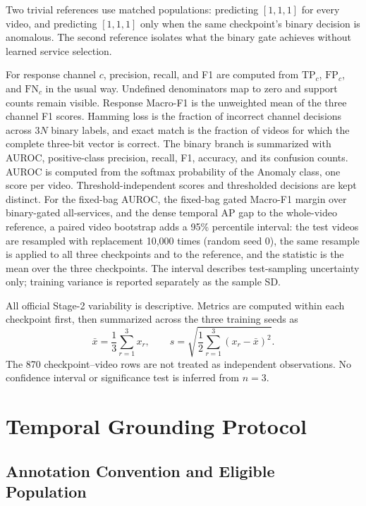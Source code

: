 Two trivial references use matched populations: predicting $[1,1,1]$ for every video, and predicting $[1,1,1]$ only when the same checkpoint's binary decision is anomalous. The second reference isolates what the binary gate achieves without learned service selection.

For response channel $c$, precision, recall, and F1 are computed from $\mathrm{TP}_c$, $\mathrm{FP}_c$, and $\mathrm{FN}_c$ in the usual way. Undefined denominators map to zero and support counts remain visible. Response Macro-F1 is the unweighted mean of the three channel F1 scores. Hamming loss is the fraction of incorrect channel decisions across $3N$ binary labels, and exact match is the fraction of videos for which the complete three-bit vector is correct. The binary branch is summarized with AUROC, positive-class precision, recall, F1, accuracy, and its confusion counts. AUROC is computed from the softmax probability of the Anomaly class, one score per video. Threshold-independent scores and thresholded decisions are kept distinct. For the fixed-bag AUROC, the fixed-bag gated Macro-F1 margin over binary-gated all-services, and the dense temporal AP gap to the whole-video reference, a paired video bootstrap adds a 95\% percentile interval: the test videos are resampled with replacement 10,000 times (random seed 0), the same resample is applied to all three checkpoints and to the reference, and the statistic is the mean over the three checkpoints. The interval describes test-sampling uncertainty only; training variance is reported separately as the sample SD.

All official Stage-2 variability is descriptive. Metrics are computed within each checkpoint first, then summarized across the three training seeds as
\begin{equation}
    \bar{x}=\frac{1}{3}\sum_{r=1}^{3}x_r,
    \qquad
    s=\sqrt{\frac{1}{2}\sum_{r=1}^{3}(x_r-\bar{x})^2}.
\end{equation}
The 870 checkpoint--video rows are not treated as independent observations. No confidence interval or significance test is inferred from $n=3$.

\section{Temporal Grounding Protocol}
\label{sec:temporal-evaluation}

\subsection{Annotation Convention and Eligible Population}

